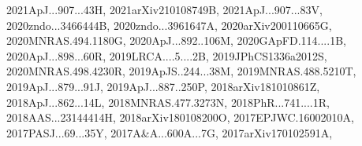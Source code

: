 \documentclass[12pt]{article}
\begin{document}
{2021ApJ...907...43H,%
2021arXiv210108749B,%
2021ApJ...907...83V,%
2020zndo...3466444B,%
2020zndo...3961647A,%
2020arXiv200110665G,%
2020MNRAS.494.1180G,%
2020ApJ...892..106M,%
2020GApFD.114....1B,%
2020ApJ...898...60R,%
2019LRCA....5....2B,%
2019JPhCS1336a2012S,%
2020MNRAS.498.4230R,%
2019ApJS..244...38M,%
2019MNRAS.488.5210T,%
2019ApJ...879...91J,%
2019ApJ...887..250P,%
2018arXiv181010861Z,%
2018ApJ...862...14L,%
2018MNRAS.477.3273N,%
2018PhR...741....1R,%
2018AAS...23144414H,%
2018arXiv180108200O,%
2017EPJWC.16002010A,%
2017PASJ...69...35Y,%
2017A&A...600A...7G,%
2017arXiv170102591A,%
}
\end{document}
